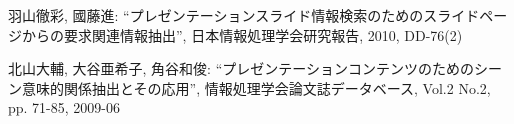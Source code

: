 \documentclass{js}
\begin{document}
\begin{thebibliography}{99}




羽山徹彩, 國藤進: 
``プレゼンテーションスライド情報検索のためのスライドページからの要求関連情報抽出'',
日本情報処理学会研究報告, 2010, DD-76(2)

北山大輔, 大谷亜希子, 角谷和俊: 
``プレゼンテーションコンテンツのためのシーン意味的関係抽出とその応用'', 
 情報処理学会論文誌データベース, Vol.2 No.2, pp. 71-85, 2009-06









\end{thebibliography}
\end{document}
